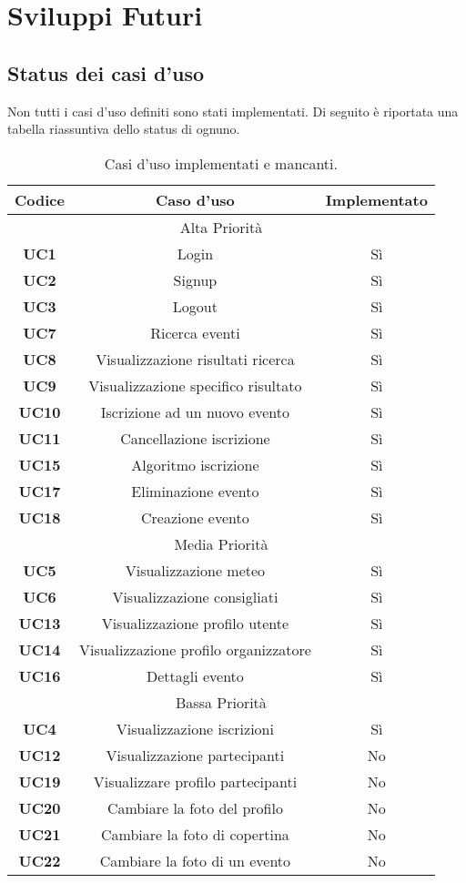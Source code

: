 \section{Sviluppi Futuri}
\subsection{Status dei casi d'uso}
Non tutti i casi d'uso definiti sono stati implementati. Di seguito è riportata una tabella riassuntiva dello status di ognuno.
\begin{table}[h!]
	\centering
	\begin{tabular}{|c|c|c|}
		\hline
		\textbf{Codice} & \textbf{Caso d'uso} & \textbf{Implementato} \\ \hline
		\multicolumn{3}{|c|}{Alta Priorità} \\ \hline
		\textbf{UC1} & Login & Sì\\ \hline
		\textbf{UC2} & Signup & Sì \\ \hline
		\textbf{UC3} & Logout & Sì \\ \hline
		\textbf{UC7} & Ricerca eventi & Sì \\ \hline
		\textbf{UC8} & Visualizzazione risultati ricerca & Sì \\ \hline
		\textbf{UC9} & Visualizzazione specifico risultato & Sì \\ \hline
		\textbf{UC10} & Iscrizione ad un nuovo evento & Sì \\ \hline
		\textbf{UC11} & Cancellazione iscrizione & Sì \\ \hline
		\textbf{UC15} & Algoritmo iscrizione & Sì \\ \hline
		\textbf{UC17} & Eliminazione evento & Sì \\ \hline
		\textbf{UC18} & Creazione evento & Sì \\ \hline
		\multicolumn{3}{|c|}{Media Priorità} \\ \hline
		\textbf{UC5} & Visualizzazione meteo & Sì\\ \hline
		\textbf{UC6} & Visualizzazione consigliati & Sì\\ \hline
		\textbf{UC13} & Visualizzazione profilo utente & Sì\\ \hline
		\textbf{UC14} & Visualizzazione profilo organizzatore & Sì\\ \hline
		\textbf{UC16} & Dettagli evento & Sì\\ \hline
		\multicolumn{3}{|c|}{Bassa Priorità} \\ \hline
		\textbf{UC4} & Visualizzazione iscrizioni & Sì\\ \hline
		\textbf{UC12} & Visualizzazione partecipanti & No\\ \hline
		\textbf{UC19} & Visualizzare profilo partecipanti & No\\ \hline
		\textbf{UC20} & Cambiare la foto del profilo & No\\ \hline
		\textbf{UC21} & Cambiare la foto di copertina & No\\ \hline
		\textbf{UC22} & Cambiare la foto di un evento & No\\ \hline
	\end{tabular}
	\caption{\label{tab:table-name}Casi d'uso implementati e mancanti.}
\end{table}
\newpage
